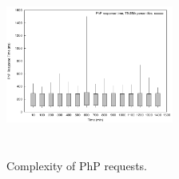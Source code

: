 \begin{figure}
\begin{center}
\includegraphics[width=0.49\textwidth, height=6cm]{./images/phpRespTimeDispersion}
\end{center}
\caption{Complexity of PhP requests.}
\label{phpRespTimeDispersion}
\end{figure}









